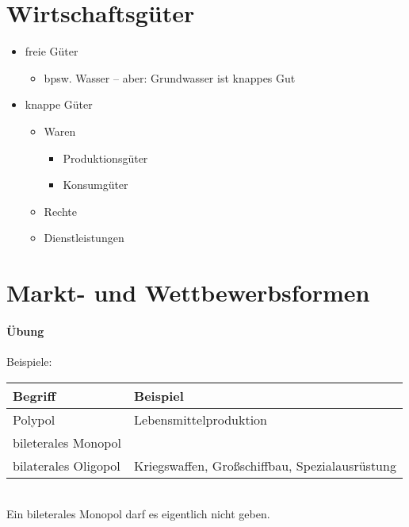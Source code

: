 \section{Wirtschaftsgüter}
\begin{itemize}
\item freie Güter
\begin{itemize}
\item bpsw. Wasser -- aber: Grundwasser ist knappes Gut
\end{itemize}
\item knappe Güter
\begin{itemize}
\item Waren
\begin{itemize}
\item Produktionsgüter
\item Konsumgüter
\end{itemize}
\item Rechte
\item Dienstleistungen
\end{itemize}
\end{itemize}

\section{Markt- und Wettbewerbsformen}
\paragraph{Übung} Beispiele:\\
\begin{tabular}{l l}
Begriff & Beispiel\\
\hline
Polypol & Lebensmittelproduktion\\
bileterales Monopol & \\
bilaterales Oligopol & Kriegswaffen, Großschiffbau, Spezialausrüstung
\end{tabular}\\
Ein bileterales Monopol darf es eigentlich nicht geben.

